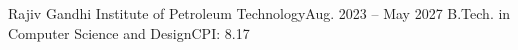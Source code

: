 \resumeSubheading
  {Rajiv Gandhi Institute of Petroleum Technology}{Aug. 2023 -- May 2027}
  {B.Tech. in Computer Science and Design}{CPI: 8.17}
